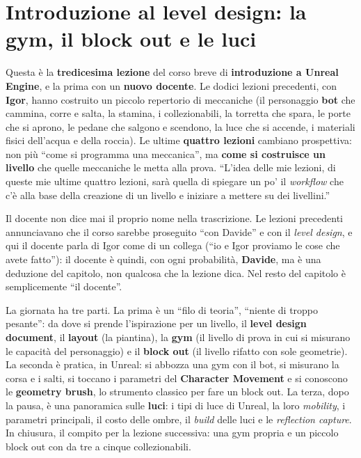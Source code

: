 \chapter[Gym, block out e luci]{Introduzione al level design: la gym, il block out
e le luci}
\label{ue13:cap:leveldesign}

Questa è la \textbf{tredicesima lezione} del corso breve di \textbf{introduzione a Unreal
Engine}, e la prima con un \textbf{nuovo docente}. Le dodici lezioni precedenti, con
\textbf{Igor}, hanno costruito un piccolo repertorio di meccaniche (il personaggio
\textbf{bot} che cammina, corre e salta, la stamina, i collezionabili, la torretta che
spara, le porte che si aprono, le pedane che salgono e scendono, la luce che si accende,
i materiali fisici dell'acqua e della roccia). Le ultime \textbf{quattro lezioni} cambiano
prospettiva: non più ``come si programma una meccanica'', ma \textbf{come si costruisce un
livello} che quelle meccaniche le metta alla prova. ``L'idea delle mie lezioni, di queste
mie ultime quattro lezioni, sarà quella di spiegare un po' il \emph{workflow} che c'è alla
base della creazione di un livello e iniziare a mettere su dei livellini.''

Il docente non dice mai il proprio nome nella trascrizione. Le lezioni precedenti
annunciavano che il corso sarebbe proseguito ``con Davide'' e con il \emph{level design}, e
qui il docente parla di Igor come di un collega (``io e Igor proviamo le cose che avete
fatto''): il docente è quindi, con ogni probabilità, \textbf{Davide}, ma è una deduzione del
capitolo, non qualcosa che la lezione dica. Nel resto del capitolo è semplicemente ``il
docente''.

La giornata ha tre parti. La prima è un ``filo di teoria'', ``niente di troppo pesante'':
da dove si prende l'ispirazione per un livello, il \textbf{level design document}, il
\textbf{layout} (la piantina), la \textbf{gym} (il livello di prova in cui si misurano le
capacità del personaggio) e il \textbf{block out} (il livello rifatto con sole geometrie).
La seconda è pratica, in Unreal: si abbozza una gym con il bot, si misurano la corsa e i
salti, si toccano i parametri del \textbf{Character Movement} e si conoscono le
\textbf{geometry brush}, lo strumento classico per fare un block out. La terza, dopo la
pausa, è una panoramica sulle \textbf{luci}: i tipi di luce di Unreal, la loro
\emph{mobility}, i parametri principali, il costo delle ombre, il \emph{build} delle luci e
le \emph{reflection capture}. In chiusura, il compito per la lezione successiva: una gym
propria e un piccolo block out con da tre a cinque collezionabili.

